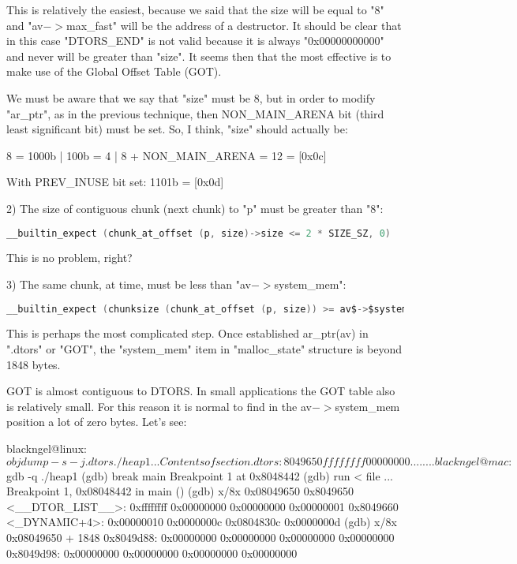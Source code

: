 \documentclass[12pt]{article}
\begin{document}
   This is relatively the easiest, because we said that the size will be
   equal to "8" and "av$->$max\_fast" will be the address of a destructor.
   It should be clear that in this case "DTORS\_END" is not valid because
   it is always "0x00000000000" and never will be greater than "size".
   It seems then that the most effective is to make use of the Global
   Offset Table (GOT).
\newline

   We must be aware that we say that "size" must be 8, but in order to
   modify "ar\_ptr", as in the previous technique, then NON\_MAIN\_ARENA bit
   (third least significant bit) must be set. So, I think, "size" should
   actually be:
\newline

\begin{verbnobox}[\small]
      8 = 1000b | 100b = 4 | 8 + NON_MAIN_ARENA = 12 = [0x0c]

      With PREV_INUSE bit set: 1101b = [0x0d] 
\end{verbnobox}

   2) The size of contiguous chunk (next chunk) to "p" must be greater
      than "8":
      
\begin{lstlisting}[language=C]
   __builtin_expect (chunk_at_offset (p, size)->size <= 2 * SIZE_SZ, 0)
\end{lstlisting}

   This is no problem, right?
\newline

   3) The same chunk, at time, must be less than "av$->$system\_mem":
   
\begin{lstlisting}[language=C]
   __builtin_expect (chunksize (chunk_at_offset (p, size)) >= av$->$system\_mem, 0)
\end{lstlisting}
	
   This is perhaps the most complicated step. Once established ar\_ptr(av)
   in ".dtors" or "GOT", the "system\_mem" item in "malloc\_state" structure
   is beyond 1848 bytes.
\newline

   GOT is almost contiguous to DTORS. In small applications the GOT table
   also is relatively small. For this reason it is normal to find in the
   av$->$system\_mem position a lot of zero bytes. Let's see:

\begin{verbnobox}[\small]
   blackngel@linux:~$ objdump -s -j .dtors ./heap1
   ...
   Contents of section .dtors:
   8049650 ffffffff 00000000
                    ........        
   blackngel@mac:~$ gdb -q ./heap1
   (gdb) break main
   Breakpoint 1 at 0x8048442
   (gdb) run < file
   ...
   Breakpoint 1, 0x08048442 in main ()
   (gdb) x/8x 0x08049650
   0x8049650 <__DTOR_LIST__>: 0xffffffff 0x00000000 0x00000000 0x00000001
   0x8049660 <_DYNAMIC+4>:    0x00000010 0x0000000c 0x0804830c 0x0000000d
   (gdb) x/8x 0x08049650 + 1848
   0x8049d88: 0x00000000   0x00000000   0x00000000   0x00000000
   0x8049d98: 0x00000000   0x00000000   0x00000000   0x00000000 
\end{verbnobox}
\end{document}
